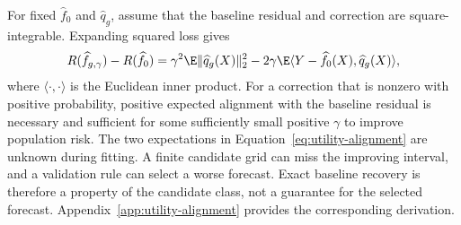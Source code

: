For fixed $\widehat f_0$ and $\widehat q_g$, assume that the baseline
residual and correction are square-integrable. Expanding squared loss gives
\begin{equation}\label{eq:utility-alignment}
 R(\widehat f_{g,\gamma})-R(\widehat f_0)
 =\gamma^2\E\|\widehat q_g(X)\|_2^2
 -2\gamma\E\langle Y-\widehat f_0(X),\widehat q_g(X)\rangle,
\end{equation}
where $\langle\cdot,\cdot\rangle$ is the Euclidean inner product. For a
correction that is nonzero with positive probability, positive expected
alignment with the baseline residual is necessary and sufficient for some
sufficiently small positive $\gamma$ to improve population risk. The two
expectations in Equation~\eqref{eq:utility-alignment} are unknown during
fitting. A finite candidate grid can miss the improving interval, and a
validation rule can select a worse forecast. Exact baseline recovery is
therefore a property of the candidate class, not a guarantee for the
selected forecast. Appendix~\ref{app:utility-alignment} provides the
corresponding derivation.
